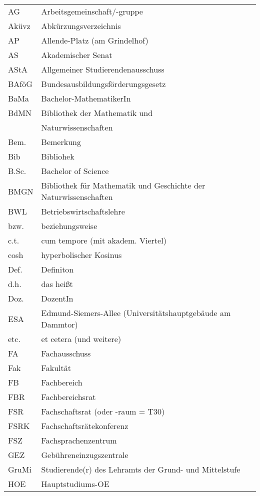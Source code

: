 \scriptsize

\begin{tabular}{|p{10mm} p{68mm}|}
\hline
AG     	& Arbeitsgemeinschaft/-gruppe \\
Aküvz  	& Abkürzungsverzeichnis \\
AP     	& Allende-Platz (am Grindelhof) \\
AS     	& Akademischer Senat \\
AStA   	& Allgemeiner Studierendenausschuss \\
BAföG 	& Bundesausbildungsförderungsgesetz \\
BaMa		& Bachelor-MathematikerIn \\
BdMN    & Bibliothek der Mathematik und\\
       	& Naturwissenschaften \\
Bem.   	& Bemerkung \\
Bib			& Bibliohek \\
B.Sc.		& Bachelor of Science \\
BMGN		& Bibliothek für Mathematik und Geschichte der Naturwissenschaften \\
BWL    	& Betriebswirtschaftslehre \\
bzw.   	& beziehungsweise \\
c.t.   	& cum tempore (mit akadem. Viertel) \\
cosh   	& hyperbolischer Kosinus \\
Def.   	& Definiton \\
d.h.   	& das heißt \\
Doz.   	& DozentIn \\
ESA    	& Edmund-Siemers-Allee (Universitäts\-haupt\-gebäude am Dammtor) \\
etc.   	& et cetera (und weitere) \\
FA			& Fachausschuss \\
Fak			& Fakultät \\
FB     	& Fachbereich \\
FBR    	& Fachbereichsrat \\
FSR    	& Fachschaftsrat (oder -raum = T30) \\
FSRK   	& Fachschaftsrätekonferenz \\
FSZ    	& Fachsprachenzentrum \\
GEZ    	& Gebühreneinzugszentrale \\
GruMi  	& Studierende(r) des Lehramts der Grund- und Mittelstufe \\
HOE    	& Hauptstudiums-OE \\

\end{tabular}
